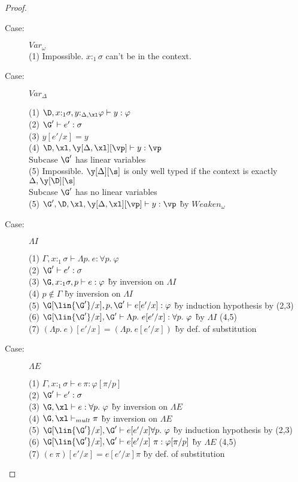 \begin{proof}
\begin{description}
\item[Case:] $Var_\omega$\\
  (1) Impossible. $x{:}_1\sigma$ can't be in the context.\\

\item[Case:] $Var_\Delta$
\begin{tabbing}
  (1) $\D, x{:}_1\sigma, y{:}_{\Delta,\xl}\varphi \vdash y : \varphi$\\
  (2) $\G' \vdash e' : \sigma$\\
  (3) $y[e'/x] = y$\\
  (4) $\D, \xl, \y[\Delta,\xl][\vp] \vdash y : \vp$\\
  Subcase $\G'$ has linear variables\\
  (5) Impossible. $\y[\Delta][\s]$ is only well typed if the context is exactly $\Delta,\y[\D][\s]$\\
  Subcase $\G'$ has no linear variables\\
  (5) $\G', \D, \xl, \y[\Delta,\xl][\vp] \vdash y : \vp$ \` by $Weaken_\omega$\\

\end{tabbing}

\item[Case:] $\Lambda I$
\begin{tabbing}
  (1) $\Gamma, x{:}_1\sigma \vdash \Lambda p.~e : \forall p.~\varphi$\\
  (2) $\G' \vdash e' : \sigma$\\
  (3) $\G, x{:}_1\sigma, p \vdash e : \varphi$ \` by inversion on $\Lambda I$\\
  (4) $p \notin \Gamma$ \` by inversion on $\Lambda I$\\
  (5) $\G[\lin{\G'}/x], p, \G' \vdash e[e'/x] : \varphi$ \` by induction hypothesis by (2,3)\\
  (6) $\G[\lin{\G'}/x], \G' \vdash \Lambda p.~e[e'/x] : \forall p.~\varphi$ \` by $\Lambda I$ (4,5)\\
  (7) $(\Lambda p.~e)[e'/x] = (\Lambda p.~e[e'/x])$ \` by def. of substitution\\
\end{tabbing}

\item[Case:] $\Lambda E$
\begin{tabbing}
  (1) $\Gamma, x{:}_1\sigma \vdash e~\pi: \varphi[\pi/p]$\\
  (2) $\G' \vdash e' : \sigma$\\
  (3) $\G, \xl \vdash e : \forall p.~\varphi$ \` by inversion on $\Lambda E$\\
  (4) $\G, \xl \vdash_{mult} \pi$ \` by inversion on $\Lambda E$\\
  (5) $\G[\lin{\G'}/x], \G' \vdash e[e'/x] \forall p.~\varphi$ \` by induction hypothesis by (2,3)\\
  (6) $\G[\lin{\G'}/x], \G' \vdash e[e'/x]~\pi : \varphi[\pi/p]$ \` by $\Lambda E$ (4,5)\\
  (7) $(e~\pi)[e'/x] = e[e'/x] \pi$ \` by def. of substitution\\
\end{tabbing}


\end{description}
\end{proof}
